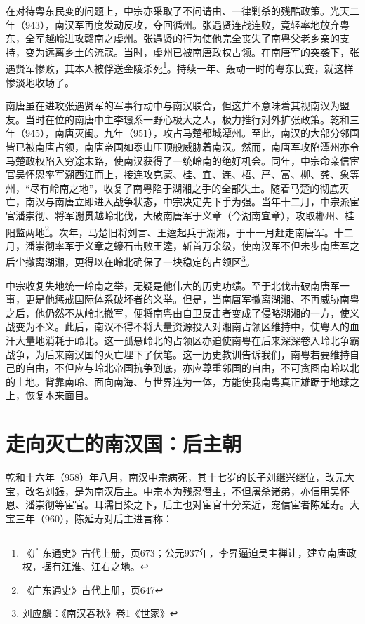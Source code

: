 在对待粤东民变的问题上，中宗亦采取了不问请由、一律剿杀的残酷政策。光天二年（943），南汉军再度发动反攻，夺回循州。张遇贤连战连败，竟轻率地放弃粤东，全军越岭进攻赣南之虔州。张遇贤的行为使他完全丧失了南粤父老乡亲的支持，变为远离乡土的流寇。当时，虔州已被南唐政权占领。在南唐军的突袭下，张遇贤军惨败，其本人被俘送金陵杀死\footnote{《广东通史》古代上册，页673；公元937年，李昇逼迫吴主禅让，建立南唐政权，据有江淮、江右之地。}。持续一年、轰动一时的粤东民变，就这样惨淡地收场了。

南唐虽在进攻张遇贤军的军事行动中与南汉联合，但这并不意味着其视南汉为盟友。当时在位的南唐中主李璟系一野心极大之人，极力推行对外扩张政策。乾和三年（945），南唐灭闽。九年（951），攻占马楚都城潭州。至此，南汉的大部分邻国皆已被南唐占领，南唐帝国如泰山压顶般威胁着南汉。然而，南唐军攻陷潭州亦令马楚政权陷入穷途末路，使南汉获得了一统岭南的绝好机会。同年，中宗命亲信宦官吴怀恩率军溯西江而上，接连攻克蒙、桂、宜、连、梧、严、富、柳、龚、象等州，“尽有岭南之地”，收复了南粤陷于湖湘之手的全部失土。随着马楚的彻底灭亡，南汉与南唐立即进入战争状态，中宗决定先下手为强。当年十二月，中宗派宦官潘崇彻、将军谢贯越岭北伐，大破南唐军于义章（今湖南宜章），攻取郴州、桂阳监两地\footnote{《广东通史》古代上册，页647}。次年，马楚旧将刘言、王逵起兵于湖湘，于十一月赶走南唐军。十二月，潘崇彻率军于义章之蠔石击败王逵，斩首万余级，使南汉军不但未步南唐军之后尘撤离湖湘，更得以在岭北确保了一块稳定的占领区\footnote{刘应麟：《南汉春秋》卷1《世家》}。

中宗收复失地统一岭南之举，无疑是他伟大的历史功绩。至于北伐击破南唐军一事，更是他惩戒国际体系破坏者的义举。但是，当南唐军撤离湖湘、不再威胁南粤之后，他仍然不从岭北撤军，便将南粤由自卫反击者变成了侵略湖湘的一方，使义战变为不义。此后，南汉不得不将大量资源投入对湘南占领区维持中，使粤人的血汗大量地消耗于岭北。这一孤悬岭北的占领区亦迫使南粤在后来深深卷入岭北争霸战争，为后来南汉国的灭亡埋下了伏笔。这一历史教训告诉我们，南粤若要维持自己的自由，不但应与岭北帝国抗争到底，亦应尊重邻国的自由，不可贪图南岭以北的土地。背靠南岭、面向南海、与世界连为一体，方能使我南粤真正雄踞于地球之上，恢复本来面目。

\section{走向灭亡的南汉国：后主朝}


\indent 乾和十六年（958）年八月，南汉中宗病死，其十七岁的长子刘继兴继位，改元大宝，改名刘鋹，是为南汉后主。中宗本为残忍僭主，不但屠杀诸弟，亦信用吴怀恩、潘崇彻等宦官。耳濡目染之下，后主也对宦官十分亲近，宠信宦者陈延寿。大宝三年（960），陈延寿对后主进言称：

